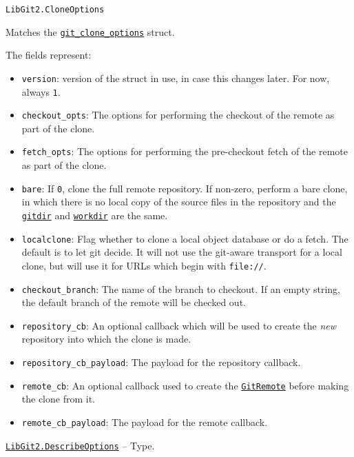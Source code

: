 \begin{adjustwidth}{2em}{0pt}


\begin{verbatim}
LibGit2.CloneOptions
\end{verbatim}

Matches the \href{https://libgit2.org/libgit2/\#HEAD/type/git\_clone\_options}{\texttt{git\_clone\_options}} struct.

The fields represent:

\begin{itemize}
\item \texttt{version}: version of the struct in use, in case this changes later. For now, always \texttt{1}.


\item \texttt{checkout\_opts}: The options for performing the checkout of the remote as part of the clone.


\item \texttt{fetch\_opts}: The options for performing the pre-checkout fetch of the remote as part of the clone.


\item \texttt{bare}: If \texttt{0}, clone the full remote repository. If non-zero, perform a bare clone, in which  there is no local copy of the source files in the repository and the \hyperlink{12125979754140967861}{\texttt{gitdir}} and \hyperlink{6689577338311178757}{\texttt{workdir}}  are the same.


\item \texttt{localclone}: Flag whether to clone a local object database or do a fetch. The default is to let git decide.  It will not use the git-aware transport for a local clone, but will use it for URLs which begin with \texttt{file://}.


\item \texttt{checkout\_branch}: The name of the branch to checkout. If an empty string, the default branch of the  remote will be checked out.


\item \texttt{repository\_cb}: An optional callback which will be used to create the \emph{new} repository into which  the clone is made.


\item \texttt{repository\_cb\_payload}: The payload for the repository callback.


\item \texttt{remote\_cb}: An optional callback used to create the \hyperlink{9925970107179782013}{\texttt{GitRemote}} before making the clone from it.


\item \texttt{remote\_cb\_payload}: The payload for the remote callback.

\end{itemize}


\end{adjustwidth}
\hypertarget{7523488922232000806}{}
\hyperlink{7523488922232000806}{\texttt{LibGit2.DescribeOptions}}  -- {Type.}

